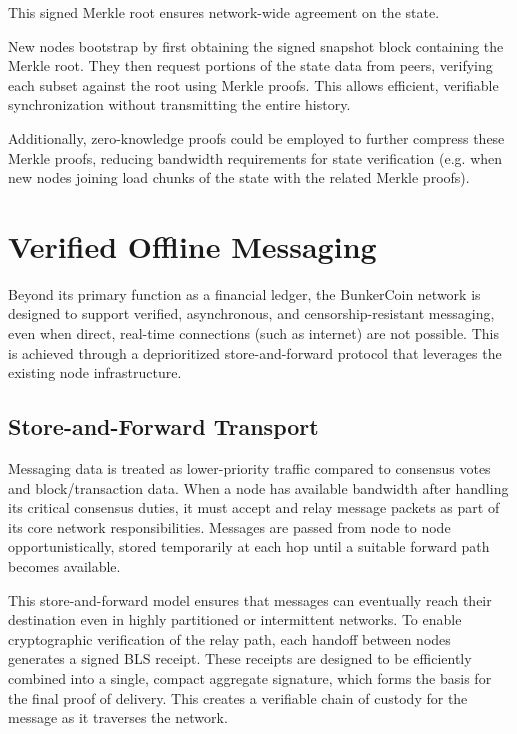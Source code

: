 \documentclass{article}
\begin{document}
This signed Merkle root ensures network-wide agreement on the state.

New nodes bootstrap by first obtaining the signed snapshot block containing the Merkle root. They then request portions of the state data from peers, verifying each subset against the root using Merkle proofs. This allows efficient, verifiable synchronization without transmitting the entire history.

Additionally, zero-knowledge proofs could be employed to further compress these Merkle proofs, reducing bandwidth requirements for state verification (e.g. when new nodes joining load chunks of the state with the related Merkle proofs).

\section{Verified Offline Messaging}
\label{sec:messaging}

Beyond its primary function as a financial ledger, the BunkerCoin network is designed to support verified, asynchronous, and censorship-resistant messaging, even when direct, real-time connections (such as internet) are not possible. This is achieved through a deprioritized store-and-forward protocol that leverages the existing node infrastructure.

\subsection{Store-and-Forward Transport}

Messaging data is treated as lower-priority traffic compared to consensus votes and block/transaction data. When a node has available bandwidth after handling its critical consensus duties, it must accept and relay message packets as part of its core network responsibilities. Messages are passed from node to node opportunistically, stored temporarily at each hop until a suitable forward path becomes available.

This store-and-forward model ensures that messages can eventually reach their destination even in highly partitioned or intermittent networks. To enable cryptographic verification of the relay path, each handoff between nodes generates a signed BLS receipt. These receipts are designed to be efficiently combined into a single, compact aggregate signature, which forms the basis for the final proof of delivery. This creates a verifiable chain of custody for the message as it traverses the network.
\end{document}
